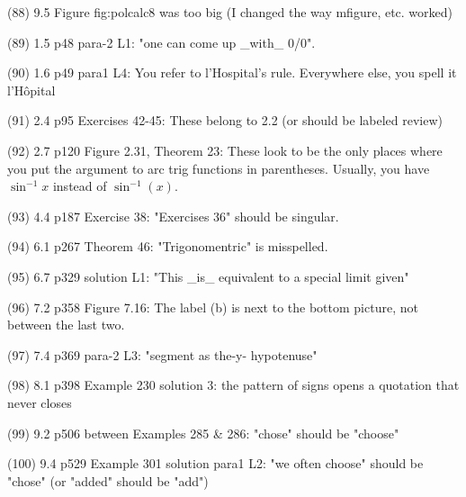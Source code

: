{(88)  9.5 Figure fig:polcalc8 was too big (I changed the way mfigure, etc. worked)

(89)  1.5 p48 para-2 L1: "one can come up _with_ 0/0".

(90)  1.6 p49 para1 L4: You refer to l'Hospital's rule.  Everywhere else, you spell it l'H\^opital

(91)  2.4 p95 Exercises 42-45: These belong to 2.2 (or should be labeled review)

(92)  2.7 p120 Figure 2.31, Theorem 23: These look to be the only places where you put the argument to arc trig functions in parentheses.  Usually, you have $\sin^{-1}x$ instead of $\sin^{-1}(x)$.

(93)  4.4 p187 Exercise 38: "Exercises 36" should be singular.

(94)  6.1 p267 Theorem 46: "Trigonomentric" is misspelled.

(95)  6.7 p329 solution L1: "This _is_ equivalent to a special limit given"

(96)  7.2 p358 Figure 7.16: The label (b) is next to the bottom picture, not between the last two.

(97)  7.4 p369 para-2 L3: "segment as the-y- hypotenuse"

(98)  8.1 p398 Example 230 solution 3: the pattern of signs opens a quotation that never closes

(99)  9.2 p506 between Examples 285 & 286: "chose" should be "choose"

(100)  9.4 p529 Example 301 solution para1 L2: "we often choose" should be "chose" (or "added" should be "add")

}
